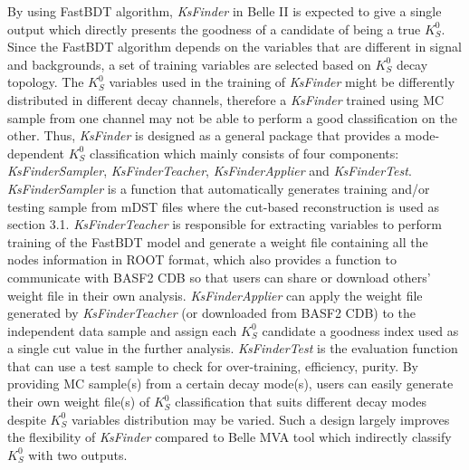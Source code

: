 By using FastBDT algorithm, \textit{KsFinder} in Belle II is expected to give a single output which directly presents the goodness of a candidate of being a true $K_S^0$. Since the FastBDT algorithm depends on the variables that are different in signal and backgrounds, a set of training variables are selected based on $K_S^0$ decay topology.  The $K_S^0$ variables used in the training of \textit{KsFinder} might be differently distributed in different decay channels, therefore a \textit{KsFinder} trained using MC sample from one channel may not be able to perform a good classification on the other. Thus, \textit{KsFinder} is designed as a general package that provides a mode-dependent $K_S^0$ classification which mainly consists of four components: \textit{KsFinderSampler}, \textit{KsFinderTeacher}, \textit{KsFinderApplier} and \textit{KsFinderTest}. \textit{KsFinderSampler} is a function that automatically generates training and/or testing sample from mDST files where the cut-based reconstruction is used as section 3.1. \textit{KsFinderTeacher} is responsible for extracting variables to perform training of the FastBDT model and generate a weight file containing all the nodes information in ROOT format, which also provides a function to communicate with BASF2 CDB so that users can share or download others' weight file in their own analysis. \textit{KsFinderApplier} can apply the weight file generated by \textit{KsFinderTeacher} (or downloaded from BASF2 CDB) to the independent data sample and assign each $K_S^0$ candidate a goodness index used as a single cut value in the further analysis. \textit{KsFinderTest} is the evaluation function that can use a test sample to check for over-training, efficiency, purity.  By providing MC sample(s) from a certain decay mode(s), users can easily generate their own weight file(s) of $K_S^0$ classification that suits different decay modes despite $K_S^0$ variables distribution may be varied. Such a design largely improves the flexibility of \textit{KsFinder} compared to Belle MVA tool which indirectly classify $K_S^0$ with two outputs. 

